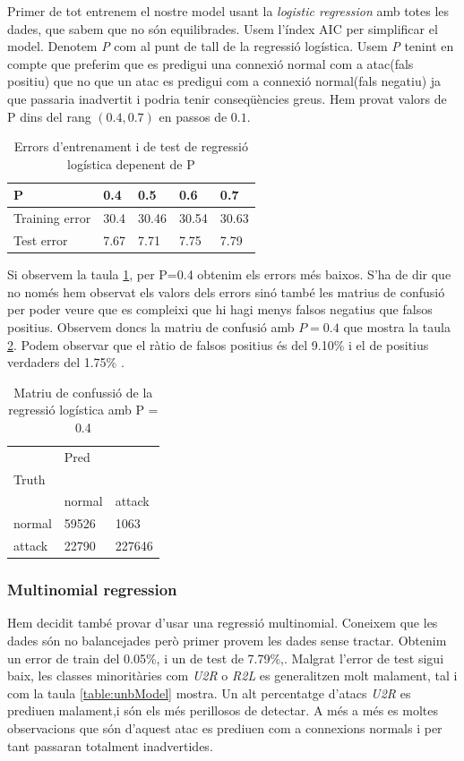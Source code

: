 \documentclass[a4paper]{article} %
\begin{document}
Primer de tot entrenem el nostre model usant la \textit{logistic regression} amb totes les dades, que sabem que no són equilibrades.
Usem l'índex AIC \cite{wiki:AIC} per simplificar el model.
Denotem \textit{P} com al punt de tall de la regressió logística.
Usem \textit{P} tenint en compte que preferim que es predigui una connexió normal com a atac(fals positiu) que no que un atac es predigui com a connexió normal(fals negatiu) ja que passaria inadvertit i podria tenir conseqüències greus.
Hem provat valors de  P dins del rang $(0.4,0.7)$ en passos de $0.1$.
\begin{table}[h]
	\centering
	\begin{tabular}{l|llll}
		P              & 0.4  & 0.5   & 0.6   & 0.7   \\
		\hline 
		Training error & 30.4 & 30.46 & 30.54 & 30.63 \\
		Test error     & 7.67 & 7.71  & 7.75  & 7.79 
	\end{tabular}
	\caption{Errors d'entrenament i de test de regressió logística depenent de P}
	\label{cut}
\end{table}

Si observem la taula \ref{cut}, per P=0.4 obtenim els errors més baixos. 
S'ha de dir que no només hem observat els valors dels errors sinó també les matrius de confusió per poder veure que es compleixi que hi hagi menys falsos negatius que falsos positius.
Observem doncs la matriu de confusió amb $P = 0.4$ que mostra la taula \ref{logistic}. Podem observar que el ràtio de falsos positius és del 9.10\% i el de positius verdaders del 1.75\%  . 

\begin{table}[h]
	\centering
	\begin{tabular}{l|ll}
		& Pred   &        \\
		Truth  &        &        \\
		& normal & attack \\
		\hline
		normal & 59526  & 1063   \\
		attack & 22790  & 227646
	\end{tabular}
	\caption{Matriu de confussió de la regressió logística amb P = 0.4}
	\label{logistic}
\end{table}


\subsubsection{Multinomial regression}
Hem decidit també provar d'usar una regressió multinomial. Coneixem que les dades són no balancejades però primer provem les dades sense tractar. Obtenim un error de train del 0.05\%, i un de test de 7.79\%,. Malgrat l'error de test sigui baix, les classes minoritàries com \textit{U2R} o \textit{R2L} es generalitzen molt malament, tal i com la taula \ref{table:unbModel} mostra. Un alt percentatge d'atacs \textit{U2R} es prediuen malament,i són els més perillosos de detectar. A més a més es moltes observacions que són d'aquest atac es prediuen com a connexions normals i per tant passaran totalment inadvertides. 
\end{document}
